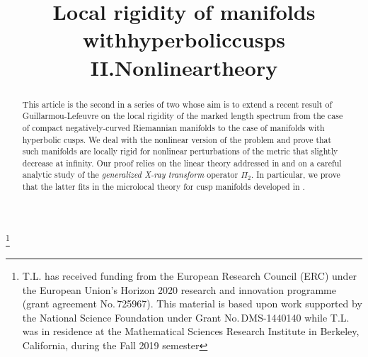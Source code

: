 \documentclass[JEP,XML,SOM,Unicode,NoFloatCountersInSection]{cedram}
\theoremstyle{plain}
\theoremstyle{definition}
\begin{document}
\frontmatter
\title[Local rigidity of manifolds with hyperbolic cusps]{Local rigidity of manifolds with\nobreakspace hyperbolic\nobreakspace cusps II.\nobreakspace Nonlinear\nobreakspace theory}

\author[\initial{Y.} \lastname{Guedes Bonthonneau}]{ }
\address{Université Paris Nord, CNRS, LAGA\\
Villetaneuse, France}

\author[\initial{Th.} \lastname{Lefeuvre}]{ }
\address{Université de Paris and Sorbonne Université, CNRS, IMJ-PRG\\ F-75006 Paris, France.}

\thanks{T.L. has received funding from the European Research Council
(ERC) under the European Union’s Horizon 2020 research and innovation programme (grant agreement No.\,725967). This material is based upon work supported by the National Science Foundation under Grant No.\,DMS-1440140 while T.L. was in residence at the Mathematical Sciences Research Institute in Berkeley, California, during the Fall 2019 semester}

\begin{abstract}
This article is the second in a series of two whose aim is to extend a recent result of Guillarmou-Lefeuvre \cite{Guillarmou-Lefeuvre-18} on the local rigidity of the marked length spectrum from the case of compact negatively-curved Riemannian manifolds to the case of manifolds with hyperbolic cusps. We deal with the nonlinear version of the problem and prove that such manifolds are locally rigid for nonlinear perturbations of the metric that slightly decrease at infinity. Our proof relies on the linear theory addressed in \cite{Bonthonneau-Lefeuvre-19-1} and on a careful analytic study of the \emph{generalized X-ray transform} operator $\Pi_2$. In particular, we prove that the latter fits in the microlocal theory for cusp manifolds developed in \cite{Bonthonneau-16, Bonthonneau-Weich-17, Bonthonneau-Lefeuvre-19-1}.
\end{abstract}



\end{document}

